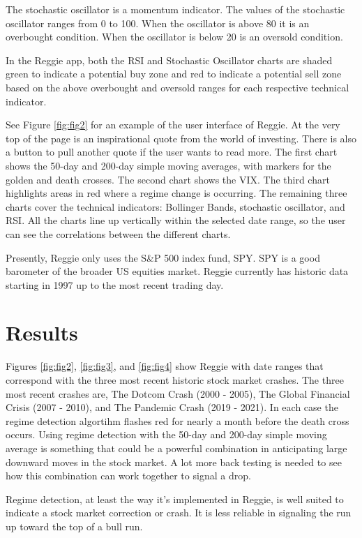 \documentclass[conference]{IEEEtran}
\begin{document}
The stochastic oscillator is a momentum indicator. The values of the stochastic oscillator ranges from 0 to 100. When the oscillator is above 80 it is an overbought condition. When the oscillator is below 20 is an oversold condition.

In the Reggie app, both the RSI and Stochastic Oscillator charts are shaded green to indicate a potential buy zone and red to indicate a potential sell zone based on the above overbought and oversold ranges for each respective technical indicator.

See Figure \ref{fig:fig2} for an example of the user interface of Reggie. At the very top of the page is an inspirational quote from the world of investing. There is also a button to pull another quote if the user wants to read more. The first chart shows the 50-day and 200-day simple moving averages, with markers for the golden and death crosses. The second chart shows the VIX. The third chart highlights areas in red where a regime change is occurring. The remaining three charts cover the technical indicators: Bollinger Bands, stochastic oscillator, and RSI. All the charts line up vertically within the selected date range, so the user can see the correlations between the different charts. 

Presently, Reggie only uses the S\&P 500 index fund, SPY. SPY is a good barometer of the broader US equities market. Reggie currently has historic data starting in 1997 up to the most recent trading day. 

\section{Results}

Figures \ref{fig:fig2}, \ref{fig:fig3}, and \ref{fig:fig4} show Reggie with date ranges that correspond with the three most recent historic stock market crashes. The three most recent crashes are, The Dotcom Crash (2000 - 2005), The Global Financial Crisis (2007 - 2010), and The Pandemic Crash (2019 - 2021). In each case the regime detection algortihm flashes red for nearly a month before the death cross occurs. Using regime detection with the 50-day and 200-day simple moving average is something that could be a powerful combination in anticipating large downward moves in the stock market. A lot more back testing is needed to see how this combination can work together to signal a drop.

Regime detection, at least the way it's implemented in Reggie, is well suited to indicate a stock market correction or crash. It is less reliable in signaling the run up toward the top of a bull run. 
\end{document}

